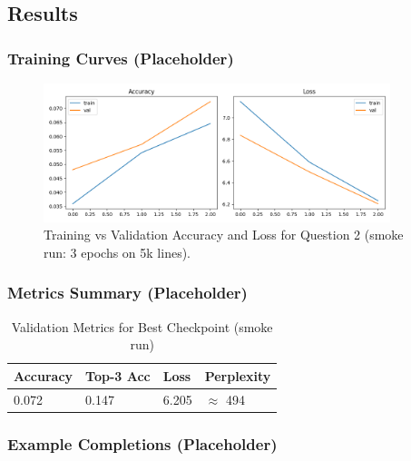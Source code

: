 \documentclass[12pt,a4paper]{article}
\begin{document}
\subsection{Results}

\subsubsection{Training Curves (Placeholder)}

\begin{figure}[H]
\centering
\includegraphics[width=0.9\textwidth]{reports/plots/training_curves.png}
\caption{Training vs Validation Accuracy and Loss for Question 2 (smoke run: 3 epochs on 5k lines).}
\label{fig:q2_curves}
\end{figure}

\subsubsection{Metrics Summary (Placeholder)}

\begin{table}[H]
\centering
\caption{Validation Metrics for Best Checkpoint (smoke run)}
\begin{tabular}{@{}llll@{}}
\toprule
\textbf{Accuracy} & \textbf{Top-3 Acc} & \textbf{Loss} & \textbf{Perplexity} \\ \midrule
0.072 & 0.147 & 6.205 & $\approx$ 494 \\ \bottomrule
\end{tabular}
\end{table}

\subsubsection{Example Completions (Placeholder)}
\end{document}

